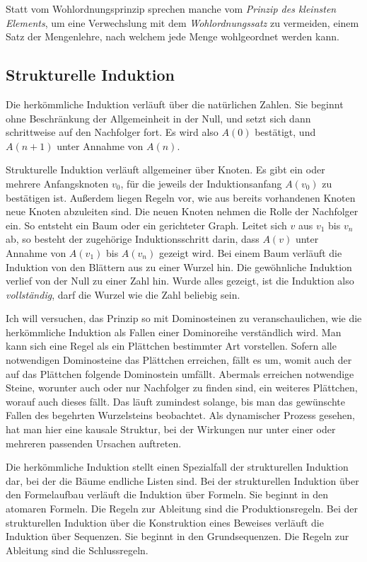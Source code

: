Statt vom Wohlordnungsprinzip sprechen manche vom \emph{Prinzip des
kleinsten Elements}, um eine Verwechslung mit dem \emph{Wohlordnungssatz}
zu vermeiden, einem Satz der Mengenlehre, nach welchem jede
Menge wohlgeordnet werden kann.

\subsection{Strukturelle Induktion}\label{sec:Strukturelle-Induktion}

Die herkömmliche Induktion verläuft über die natürlichen Zahlen.
Sie beginnt ohne Beschränkung der Allgemeinheit in der Null, und setzt
sich dann schrittweise auf den Nachfolger fort. Es wird also $A(0)$
bestätigt, und $A(n+1)$ unter Annahme von $A(n)$.

Strukturelle Induktion verläuft allgemeiner über Knoten. Es gibt ein
oder mehrere Anfangsknoten $v_0$, für die jeweils der Induktionsanfang $A(v_0)$
zu bestätigen ist. Außerdem liegen Regeln vor, wie aus bereits vorhandenen
Knoten neue Knoten abzuleiten sind. Die neuen Knoten nehmen die Rolle der
Nachfolger ein. So entsteht ein Baum oder ein gerichteter Graph.
Leitet sich $v$ aus $v_1$ bis $v_n$ ab, so besteht der zugehörige
Induktionsschritt darin, dass $A(v)$ unter Annahme von $A(v_1)$
bis $A(v_n)$ gezeigt wird. Bei einem Baum verläuft die Induktion von
den Blättern aus zu einer Wurzel hin. Die gewöhnliche Induktion verlief
von der Null zu einer Zahl hin. Wurde alles gezeigt, ist die Induktion
also \emph{vollständig}, darf die Wurzel wie die Zahl beliebig sein.

Ich will versuchen, das Prinzip so mit Dominosteinen zu veranschaulichen,
wie die herkömmliche Induktion als Fallen einer Dominoreihe verständlich
wird. Man kann sich eine Regel als ein Plättchen bestimmter Art vorstellen.
Sofern alle notwendigen Dominosteine das Plättchen erreichen, fällt es
um, womit auch der auf das Plättchen folgende Dominostein umfällt.
Abermals erreichen notwendige Steine, worunter auch oder nur Nachfolger
zu finden sind, ein weiteres Plättchen, worauf auch dieses fällt.
Das läuft zumindest solange, bis man das gewünschte Fallen des
begehrten Wurzelsteins beobachtet. Als dynamischer Prozess gesehen,
hat man hier eine kausale Struktur, bei der Wirkungen nur unter einer
oder mehreren passenden Ursachen auftreten.

Die herkömmliche Induktion stellt einen Spezialfall der strukturellen
Induktion dar, bei der die Bäume endliche Listen sind. Bei
der strukturellen Induktion über den Formelaufbau verläuft die Induktion
über Formeln. Sie beginnt in den atomaren Formeln. Die Regeln zur
Ableitung sind die Produktionsregeln. Bei der strukturellen Induktion
über die Konstruktion eines Beweises verläuft die Induktion über
Sequenzen. Sie beginnt in den Grundsequenzen. Die Regeln zur Ableitung
sind die Schlussregeln.

